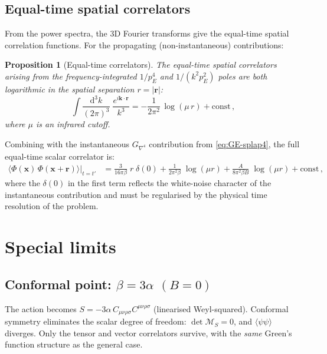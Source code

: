 \documentclass[11pt,a4paper]{article}
\newcommand{\dd}{\mathrm{d}}
\newtheorem{proposition}{Proposition}
\theoremstyle{definition}
\theoremstyle{remark}
\begin{document}
\subsection{Equal-time spatial correlators}

From the power spectra, the 3D Fourier transforms give the
equal-time spatial correlation functions.  For the propagating
(non-instantaneous) contributions:

\begin{proposition}[Equal-time correlators]\label{prop:et}
The equal-time spatial correlators arising from the frequency-integrated
$1/p_E^4$ and $1/(k^2 p_E^2)$ poles are both logarithmic in the
spatial separation $r = |\mathbf{r}|$:
\begin{equation}\label{eq:et-log}
  \int\frac{\dd^3k}{(2\pi)^3}\;\frac{e^{i\mathbf{k}\cdot\mathbf{r}}}{k^3}
  = -\frac{1}{2\pi^2}\,\log(\mu\, r) + \text{const}\,,
\end{equation}
where $\mu$ is an infrared cutoff.
\end{proposition}

Combining with the instantaneous $G_{\nabla^4}$ contribution from
\cref{eq:GE-splap4}, the full equal-time scalar correlator is:
\begin{align}
  \langle\Phi(\mathbf{x})\,\Phi(\mathbf{x}+\mathbf{r})\rangle
  \big|_{t=t'}
  &= \frac{3}{16\pi\beta}\;r\;\delta(0)
   + \frac{1}{2\pi^2\beta}\;\log(\mu r)
   + \frac{A}{8\pi^2\beta B}\;\log(\mu r)
   + \text{const}\,,
  \label{eq:et-PhiPhi}
\end{align}
where the $\delta(0)$ in the first term reflects the white-noise
character of the instantaneous contribution and must be regularised
by the physical time resolution of the problem.

\section{Special limits}
\label{sec:limits}

\subsection{Conformal point: $\beta = 3\alpha$ \texorpdfstring{$(B=0)$}{(B=0)}}

The action becomes $S = -3\alpha\,C_{\mu\nu\rho\sigma}C^{\mu\nu\rho\sigma}$
(linearised Weyl-squared).  Conformal symmetry eliminates the scalar
degree of freedom: $\det\mathcal{M}_S = 0$, and $\langle\psi\psi\rangle$
diverges.  Only the tensor and vector correlators survive, with the
\emph{same} Green's function structure as the general case.
\end{document}
